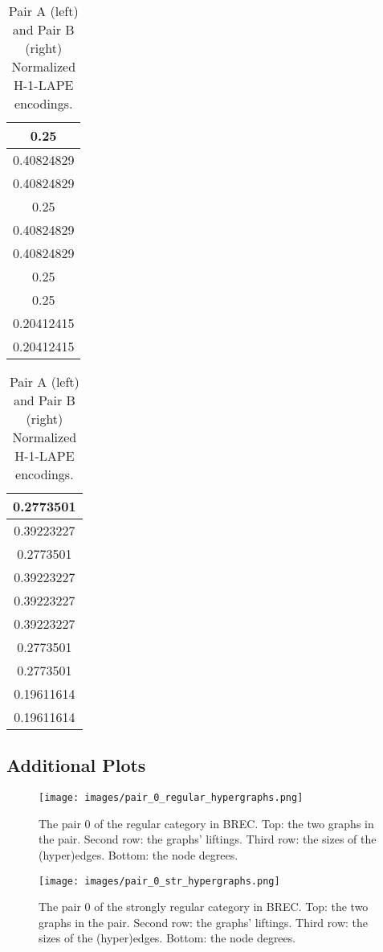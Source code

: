 \begin{table}[H]
\footnotesize
\centering
  \begin{tabular}{|c|}
    \hline
     0.25      \\
          \hline
     0.40824829\\
          \hline
     0.40824829\\
          \hline
     0.25      \\
          \hline
     0.40824829\\
          \hline
     0.40824829\\
          \hline
     0.25      \\
          \hline
     0.25      \\
          \hline
     0.20412415\\
          \hline
     0.20412415\\
    \hline
  \end{tabular}
  \begin{tabular}{|c|}
    \hline
     0.2773501 \\
     \hline
   0.39223227\\
     \hline
    0.2773501 \\
     \hline
     0.39223227\\
         \hline
     0.39223227\\
          \hline
      0.39223227\\
           \hline
       0.2773501 \\
            \hline
     0.2773501 \\
          \hline
        0.19611614\\
             \hline
      0.19611614\\
    \hline
  \end{tabular}
\caption{Pair A (left) and Pair B (right) Normalized H-1-LAPE encodings.}
\label{tab:sidetables-hg-lape-norm}
\end{table}



\subsection{Additional Plots}

\begin{figure}[H]
\footnotesize
  \centering
  \texttt{[image: images/pair\_0\_regular\_hypergraphs.png]}
  \caption{The pair 0 of the regular category in BREC. Top: the two graphs in the pair. Second row: the graphs' liftings. Third row: the sizes of the (hyper)edges. Bottom: the node degrees.}
  \label{fig:pair-0-lifting}
\end{figure}

\begin{figure}[H]
  \centering
  \texttt{[image: images/pair\_0\_str\_hypergraphs.png]}
  \caption{The pair 0 of the strongly regular category in BREC. Top: the two graphs in the pair. Second row: the graphs' liftings. Third row: the sizes of the (hyper)edges. Bottom: the node degrees.}
  \label{fig:pair-0-lifting}
\end{figure}